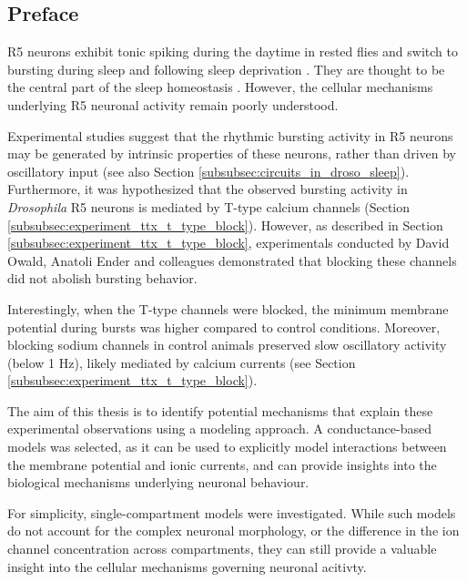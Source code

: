 \documentclass[../main.tex]{subfiles}
\begin{document}
\subsection{Preface}

R5 neurons exhibit tonic spiking during the daytime in rested flies and switch to bursting during sleep and following sleep deprivation \parencite{liuSleepDriveEncoded2016,raccugliaCoherentMultilevelNetwork2022,raccugliaNetworkSpecificSynchronizationElectrical2019}. They are thought to be the central part of the sleep homeostasis \parencite{liuSleepDriveEncoded2016}.
However, the cellular mechanisms underlying R5 neuronal activity remain poorly understood.

Experimental studies suggest that the rhythmic bursting activity in R5 neurons may be generated by intrinsic properties of these neurons, rather than driven by oscillatory input \parencite{raccugliaNetworkSpecificSynchronizationElectrical2019} (see also Section \ref{subsubsec:circuits_in_droso_sleep}).
Furthermore, it was hypothesized that the observed bursting activity in \textit{Drosophila} R5 neurons is mediated by T-type calcium channels (Section \ref{subsubsec:experiment_ttx_t_type_block}). However, as described in Section \ref{subsubsec:experiment_ttx_t_type_block}, experimentals conducted by David Owald, Anatoli Ender and colleagues demonstrated that blocking these channels did not abolish bursting behavior.

Interestingly, when the T-type channels were blocked, the minimum membrane potential during bursts was higher compared to control conditions. Moreover, blocking sodium channels in control animals preserved slow oscillatory activity (below 1 Hz), likely mediated by calcium currents (see Section \ref{subsubsec:experiment_ttx_t_type_block}).

The aim of this thesis is to identify potential mechanisms that explain these experimental observations using a modeling approach. A conductance-based models was selected, as it can be used to explicitly model interactions between the membrane potential and ionic currents, and can provide insights into the biological mechanisms underlying neuronal behaviour.

For simplicity, single-compartment models were investigated. While such models do not account for the complex neuronal morphology, or the difference in the ion channel concentration across compartments, they can still provide a valuable insight into the cellular mechanisms governing neuronal acitivty.
\end{document}
